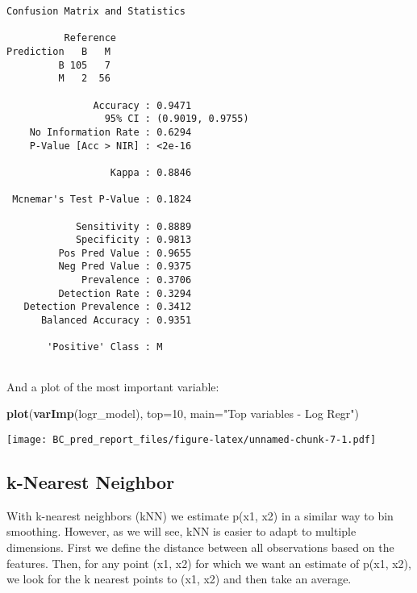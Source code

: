 \documentclass[]{article}
\newenvironment{Shaded}{\begin{snugshade}}{\end{snugshade}}
\newcommand{\DataTypeTok}[1]{\textcolor[rgb]{0.13,0.29,0.53}{#1}}
\newcommand{\DecValTok}[1]{\textcolor[rgb]{0.00,0.00,0.81}{#1}}
\newcommand{\KeywordTok}[1]{\textcolor[rgb]{0.13,0.29,0.53}{\textbf{#1}}}
\newcommand{\NormalTok}[1]{#1}
\newcommand{\StringTok}[1]{\textcolor[rgb]{0.31,0.60,0.02}{#1}}
\begin{document}
\begin{verbatim}
Confusion Matrix and Statistics

          Reference
Prediction   B   M
         B 105   7
         M   2  56
                                          
               Accuracy : 0.9471          
                 95% CI : (0.9019, 0.9755)
    No Information Rate : 0.6294          
    P-Value [Acc > NIR] : <2e-16          
                                          
                  Kappa : 0.8846          
                                          
 Mcnemar's Test P-Value : 0.1824          
                                          
            Sensitivity : 0.8889          
            Specificity : 0.9813          
         Pos Pred Value : 0.9655          
         Neg Pred Value : 0.9375          
             Prevalence : 0.3706          
         Detection Rate : 0.3294          
   Detection Prevalence : 0.3412          
      Balanced Accuracy : 0.9351          
                                          
       'Positive' Class : M               
                                          
\end{verbatim}

And a plot of the most important variable:

\begin{Shaded}
\begin{Highlighting}[]
\KeywordTok{plot}\NormalTok{(}\KeywordTok{varImp}\NormalTok{(logr_model), }\DataTypeTok{top=}\DecValTok{10}\NormalTok{, }\DataTypeTok{main=}\StringTok{"Top variables - Log Regr"}\NormalTok{)}
\end{Highlighting}
\end{Shaded}

\texttt{[image: BC\_pred\_report\_files/figure-latex/unnamed-chunk-7-1.pdf]}

\hypertarget{k-nearest-neighbor}{%
\subsection{k-Nearest Neighbor}\label{k-nearest-neighbor}}

With k-nearest neighbors (kNN) we estimate p(x1, x2) in a similar way to
bin smoothing. However, as we will see, kNN is easier to adapt to
multiple dimensions. First we define the distance between all
observations based on the features. Then, for any point (x1, x2) for
which we want an estimate of p(x1, x2), we look for the k nearest points
to (x1, x2) and then take an average.
\end{document}

